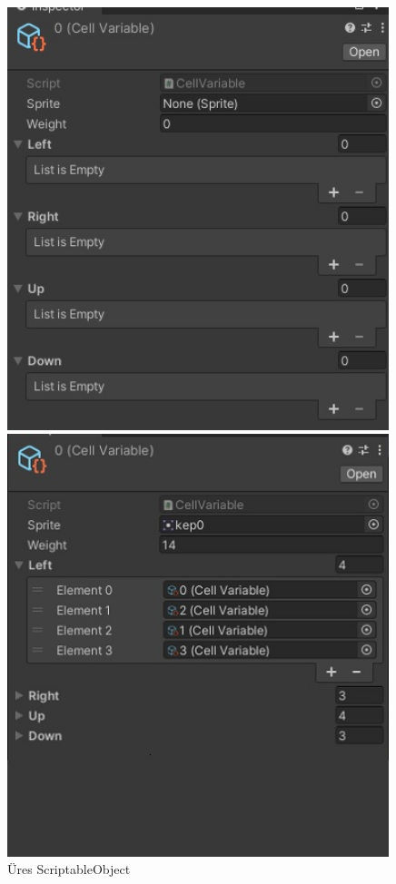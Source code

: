 \begin{figure}[h]
\centering
\begin{minipage}{.5\textwidth}
  \centering
  \includegraphics[width=0.99\textwidth]{images/scriptable-object-cell.jpg}
  \caption{Üres ScriptableObject}
  \label{fig:ures-scriptable}
\end{minipage}%
\begin{minipage}{.5\textwidth}
  \centering
  \includegraphics[width=0.99\textwidth]{images/scriptable-object-cell-toltott.jpg}

\end{minipage}
\end{figure}
